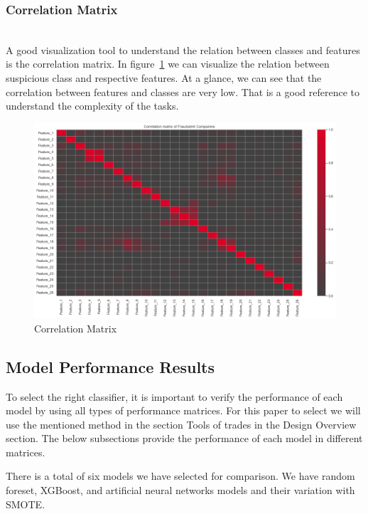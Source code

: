 \subsubsection{Correlation Matrix}\hspace*{\fill} \\
A good visualization tool to understand the relation between classes and features is the correlation matrix. In figure~\ref{fig:corr} we can visualize the relation between suspicious class and respective features. At a glance, we can see that the correlation between features and classes are very low. That is a good reference to understand the complexity of the tasks. 
\begin{figure}[H]
    \centering
    \includegraphics[width=\linewidth]{figures/corr.png}
    \caption{Correlation Matrix}
    \label{fig:corr}
\end{figure}

\subsection{Model Performance Results}\label{sec: model results}

To select the right classifier, it is important to verify the performance of each model by using all types of performance matrices. For this paper to select we will use the mentioned method in the section Tools of trades in the Design Overview section. The below subsections provide the performance of each model in different matrices. 


There is a total of six models we have selected for comparison. We have random foreset, XGBoost, and artificial neural networks models and their variation with SMOTE. 


